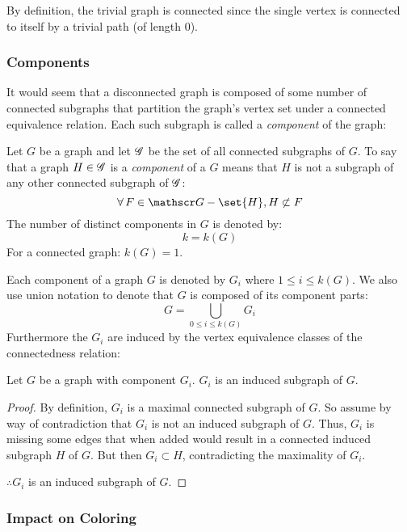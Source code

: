 By definition, the trivial graph is connected since the single vertex is connected to itself by a trivial path (of
length \(0\)).

\subsubsection{Components}

It would seem that a disconnected graph is composed of some number of connected subgraphs that partition the
graph's vertex set under a connected equivalence relation.  Each such subgraph is called a \emph{component} of the
graph:

\begin{definition}[Component]
  Let \(G\) be a graph and let \(\mathscr{G}\) be the set of all connected subgraphs of \(G\).  To say that a graph
  \(H\in\mathscr{G}\) is a \emph{component} of a \(G\) means that \(H\) is not a subgraph of any other connected subgraph
  of \(\mathscr{G}\):
  \[\forall\,F\in\SG-\set{H},H\not\subset F\]
  The number of distinct components in \(G\) is denoted by:
  \[k=k(G)\]
  For a connected graph: \(k(G)=1\).
\end{definition}

Each component of a graph \(G\) is denoted by \(G_i\) where \(1\le i\le k(G)\).  We also use union notation to
denote that \(G\) is composed of its component parts:
\[G=\bigcup_{0\le i\le k(G)}G_i\]
Furthermore the \(G_i\) are induced by the vertex equivalence classes of the connectedness relation:

\begin{theorem}
  Let \(G\) be a graph with component \(G_i\).  \(G_i\) is an induced subgraph of \(G\).
\end{theorem}

\begin{proof}
  By definition, \(G_i\) is a maximal connected subgraph of \(G\).  So assume by way of contradiction that
  \(G_i\) is not an induced subgraph of \(G\).  Thus, \(G_i\) is missing some edges that when added would result in a
  connected induced subgraph \(H\) of \(G\).  But then \(G_i\subset H\), contradicting the maximality of \(G_i\).

  \(\therefore G_i\) is an induced subgraph of \(G\).
\end{proof}

\subsubsection{Impact on Coloring}

